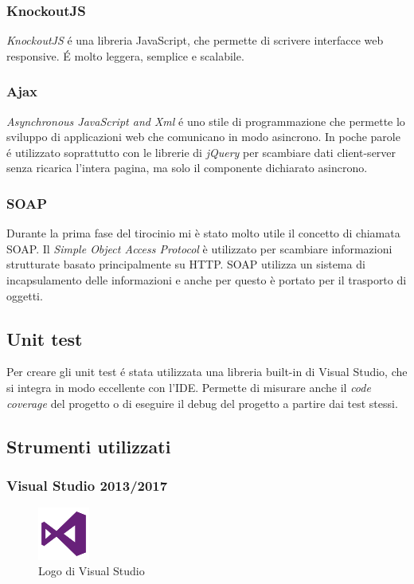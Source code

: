\subsubsection{KnockoutJS}

\textit{KnockoutJS} é una libreria JavaScript, che permette di scrivere interfacce web responsive. É molto leggera, semplice e scalabile. 

\subsubsection{Ajax}
\textit{Asynchronous JavaScript and Xml} é uno stile di programmazione che permette lo sviluppo di applicazioni web che comunicano in modo asincrono. In poche parole é utilizzato soprattutto con le librerie di \textit{jQuery} per scambiare dati client-server senza ricarica l'intera pagina, ma solo il componente dichiarato asincrono.

\subsubsection{SOAP}
Durante la prima fase del tirocinio mi è stato molto utile il concetto di chiamata SOAP. Il \textit{Simple Object Access Protocol} è utilizzato per scambiare informazioni strutturate basato principalmente su HTTP. SOAP utilizza un sistema di incapsulamento delle informazioni e anche per questo è portato per il trasporto di oggetti.

\subsection{Unit test}
Per creare gli unit test é stata utilizzata una libreria built-in di Visual Studio, che si integra in modo eccellente con l'IDE. Permette di misurare anche il \textit{code coverage} del progetto o di eseguire il debug del progetto a partire dai test stessi.

\subsection{Strumenti utilizzati}

\subsubsection{Visual Studio 2013/2017}
\begin{figure}
    \begin{center}
        \includegraphics[width=0.15\textwidth]{./res/img/visual-studio-2013-logo.png}
        \caption{Logo di Visual Studio}
    \end{center}
\end{figure}

